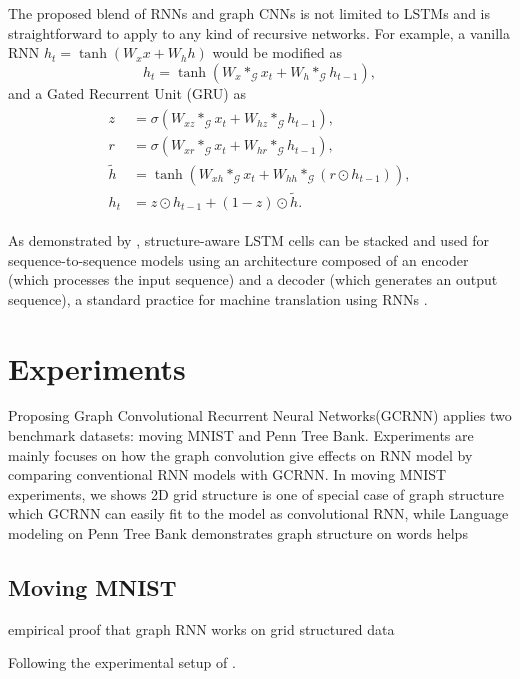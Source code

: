\documentclass{article} %
\newcommand{\G}{\mathcal{G}}
\newcommand{\todo}[1]{{\color{red} #1 }}
\begin{document}
The proposed blend of RNNs and graph CNNs is not limited to LSTMs and is
straightforward to apply to any kind of recursive networks. For example, a
vanilla RNN $h_t = \tanh(W_x x + W_h h)$ would be modified as
\begin{equation} \label{eqn:vrnn_graph}
	h_t = \tanh(W_x \ast_\G x_t + W_h \ast_\G h_{t-1}),
\end{equation}
and a Gated Recurrent Unit (GRU) \citep{gru} as
\begin{align} \label{eqn:gru_graph}
\begin{split}
	z &= \sigma(W_{xz} \ast_\G x_t + W_{hz} \ast_\G h_{t-1}), \\
	r &= \sigma(W_{xr} \ast_\G x_t + W_{hr} \ast_\G h_{t-1}), \\
	\tilde{h} &= \tanh(W_{xh} \ast_\G x_t + W_{hh} \ast_\G (r \odot h_{t-1})), \\
	h_t &= z \odot h_{t-1} + (1-z) \odot \tilde{h}.
\end{split}
\end{align}

As demonstrated by \citet{convlstm}, structure-aware LSTM cells can be stacked
and used for sequence-to-sequence models using an architecture composed of an
encoder (which processes the input sequence) and a decoder (which generates an
output sequence), a standard practice for machine translation using RNNs
\citep{gru, seq2seq}.

\section{Experiments}

Proposing Graph Convolutional Recurrent Neural Networks(GCRNN) applies two benchmark datasets: moving MNIST\citet{moving_mnist} and Penn Tree Bank\citet{ptb}. Experiments are mainly focuses on how the graph convolution give effects on RNN model by comparing conventional RNN models with GCRNN. In moving MNIST experiments, we shows 2D grid structure is one of special case of graph structure which GCRNN can easily fit to the model as convolutional RNN, while Language modeling on Penn Tree Bank demonstrates graph structure on words helps 

\subsection{Moving MNIST}
\todo{empirical proof that graph RNN works on grid structured data}


Following the experimental setup of \citet{convlstm}.
\end{document}
